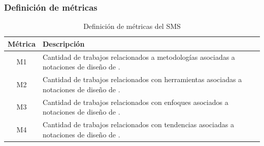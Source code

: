 \subsubsection{Definición de métricas}
\begin{table}[H]
	\centering
	\renewcommand{\arraystretch}{1.2} %
	\fontsize{9pt}{10pt}\selectfont %
	\begin{tabular}{|c|p{13cm}|} %
		\hline
		\textbf{Métrica} & \textbf{Descripción}                                                                                                                                                                                                                                                                                                                                                                                                                                                                                           \\ \hline
		M1               & Cantidad de trabajos relacionados a metodologías asociadas a notaciones de diseño de \TI. \\ \hline
		M2               & Cantidad de trabajos relacionados con herramientas asociadas a notaciones de diseño de \TI.                                                                                                                                                                                                                                                                                                                                                                                                                                                    \\ \hline
		M3               & Cantidad de trabajos relacionados con enfoques asociados a notaciones de diseño de \TI.                                                                                                                                                                                                                                                                                                                                                                                                           \\ \hline
		M4               & Cantidad de trabajos relacionados con tendencias asociadas a notaciones de diseño de \TI.                                                                                                                                                                                                                                                                                                                                                                                                                 \\ \hline
	\end{tabular}
	\caption{Definición de métricas del SMS}
	\label{tab:metricas}
\end{table}


